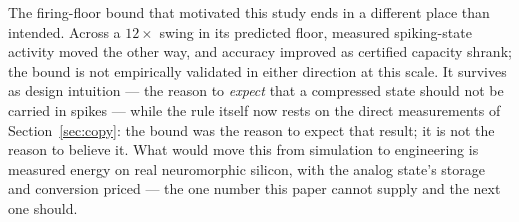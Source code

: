 The firing-floor bound that motivated this study ends in a different place than intended.
Across a $12\times$ swing in its predicted floor, measured spiking-state activity moved
the other way, and accuracy improved as certified capacity shrank; the bound is not
empirically validated in either direction at this scale. It survives as design intuition
--- the reason to \emph{expect} that a compressed state should not be carried in spikes
--- while the rule itself now rests on the direct measurements of
Section~\ref{sec:copy}: the bound was the reason to expect that result; it is not the
reason to believe it. What would move this from simulation to engineering is measured
energy on real neuromorphic silicon, with the analog state's storage and conversion
priced --- the one number this paper cannot supply and the next one should.
